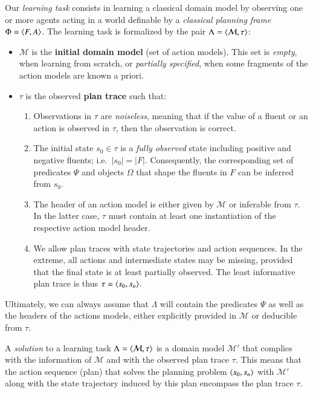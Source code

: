 Our {\em learning task} consists in learning a classical domain model by observing one or more agents acting in a world definable by a {\em classical planning frame} $\Phi={\langle F,A \rangle}$. The learning task is formalized by the pair $\Lambda={\langle \mathcal{M},\tau \rangle}$:


\begin{itemize}
\item $\mathcal{M}$ is the {\bf initial domain model} (set of action models). This set is {\em empty}, when learning from scratch, or {\em partially specified}, when some fragments of the action models are known a priori.
\item $\tau$ is the observed {\bf plan trace} such that:
\begin{enumerate}
 \item Observations in $\tau$ are {\em noiseless}, meaning that if the value of a fluent or an action is observed in $\tau$, then the observation is correct.
\item The initial state $s_0\in\tau$ is a {\em fully observed} state including positive and negative fluents; i.e.~$|s_0|=|F|$. Consequently, the corresponding set of predicates $\Psi$ and objects $\Omega$ that shape the fluents in $F$ can be inferred from $s_0$.
\item The header of an action model is either given by $\mathcal{M}$ or inferable from $\tau$. In the latter case, $\tau$ must contain at least one instantiation of the respective action model header.
\item We allow plan traces with \NO state trajectories and \NO action sequences. In the extreme, all actions and intermediate states may be missing, provided that the final state is at least partially observed. The least informative plan trace is thus $\tau = {\langle s_0,s_n \rangle}$.
\end{enumerate}
\end{itemize}

Ultimately, we can always assume that $\Lambda$ will contain the predicates $\Psi$ as well as the headers of the actions models, either explicitly provided in $\mathcal{M}$ or deducible from $\tau$.

\vspace{0.1cm}

A {\em solution} to a learning task $\Lambda={\langle \mathcal{M},\tau \rangle}$ is a domain model $\mathcal{M}'$ that complies with the information of $\mathcal{M}$ and with the observed plan trace $\tau$. \textcolor[rgb]{1.00,0.00,0.00}{This means that the action sequence (plan) that solves the planning problem ${\langle s_0,s_n \rangle}$ with $\mathcal{M}'$ along with the state trajectory induced by this plan encompass the plan trace $\tau$.}

